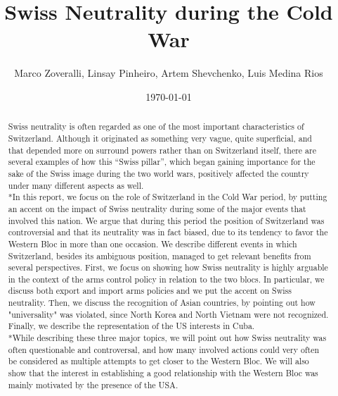 \documentclass[a4paper]{article}
\title{Swiss Neutrality during the Cold War}
\author{Marco Zoveralli, Linsay Pinheiro, Artem Shevchenko, Luis Medina Rios}
\date{\today}
\begin{document}
\maketitle

\begin{abstract}Swiss neutrality is often regarded as one of the most important characteristics of Switzerland. Although it originated as something very vague, quite superficial, and that depended more on surround powers rather than on  Switzerland itself, there are several examples of how this “Swiss pillar”, which began gaining importance for the sake of the Swiss image during the two world wars, positively affected the country under many different aspects as well. 
\\*In this report, we focus on the role of Switzerland in the Cold War period, by putting an accent on the impact of Swiss neutrality during some of the major events that involved this nation. We argue that during this period the position of Switzerland was controversial and that its neutrality was in fact biased, due to its tendency to favor the Western Bloc in more than one occasion. 
We describe different events in which Switzerland, besides its ambiguous position, managed to get relevant benefits from several perspectives. 
First, we focus on showing how Swiss neutrality is highly arguable in the context of the arms control policy in relation to the two blocs. In particular, we discuss both export and import arms policies and we put the accent on Swiss neutrality. %
Then, we discuss the recognition of Asian countries, by pointing out how "universality" was violated, since North Korea and North Vietnam were not recognized. %
Finally, we describe the representation of the US interests in Cuba. %
\\*While describing these three major topics, we will point out how Swiss neutrality was often questionable and controversal, and how many involved actions could very often be considered as multiple attempts to get closer to the Western Bloc. We will also show that the interest in establishing a good relationship with the Western Bloc was mainly motivated by the presence of the USA. %
\end{abstract}
\end{document}

